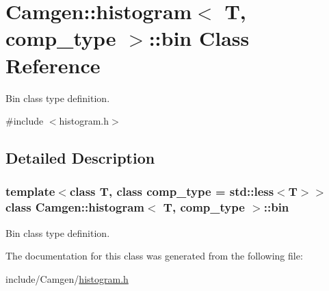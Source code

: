 \hypertarget{a00021}{}\section{Camgen\+:\+:histogram$<$ T, comp\+\_\+type $>$\+:\+:bin Class Reference}
\label{a00021}


Bin class type definition.  




{\ttfamily \#include $<$histogram.\+h$>$}



\subsection{Detailed Description}
\subsubsection*{template$<$class T, class comp\+\_\+type = std\+::less$<$\+T$>$$>$class Camgen\+::histogram$<$ T, comp\+\_\+type $>$\+::bin}

Bin class type definition. 

The documentation for this class was generated from the following file\+:\begin{DoxyCompactItemize}
\item 
include/\+Camgen/\hyperlink{a00665}{histogram.\+h}\end{DoxyCompactItemize}

